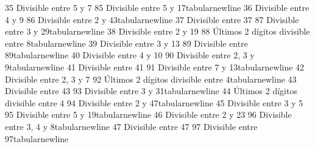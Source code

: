 {}35 \markdownRendererAmpersand{} Divisible entre 5 y 7 \markdownRendererAmpersand{} 85 \markdownRendererAmpersand{} Divisible entre 5 y 17\markdownRendererBackslash{}tabularnewline\markdownRendererSoftLineBreak
{}36 \markdownRendererAmpersand{} Divisible entre 4 y 9 \markdownRendererAmpersand{} 86 \markdownRendererAmpersand{} Divisible entre 2 y 43\markdownRendererBackslash{}tabularnewline\markdownRendererSoftLineBreak
{}37 \markdownRendererAmpersand{} Divisible entre 37 \markdownRendererAmpersand{} 87 \markdownRendererAmpersand{} Divisible entre 3 y 29\markdownRendererBackslash{}tabularnewline\markdownRendererSoftLineBreak
{}38 \markdownRendererAmpersand{} Divisible entre 2 y 19 \markdownRendererAmpersand{} 88 \markdownRendererAmpersand{} Últimos 2 dígitos divisible entre 8\markdownRendererBackslash{}tabularnewline\markdownRendererSoftLineBreak
{}39 \markdownRendererAmpersand{} Divisible entre 3 y 13 \markdownRendererAmpersand{} 89 \markdownRendererAmpersand{} Divisible entre 89\markdownRendererBackslash{}tabularnewline\markdownRendererSoftLineBreak
{}40 \markdownRendererAmpersand{} Divisible entre 4 y 10 \markdownRendererAmpersand{} 90 \markdownRendererAmpersand{} Divisible entre 2, 3 y 9\markdownRendererBackslash{}tabularnewline\markdownRendererSoftLineBreak
{}41 \markdownRendererAmpersand{} Divisible entre 41 \markdownRendererAmpersand{} 91 \markdownRendererAmpersand{} Divisible entre 7 y 13\markdownRendererBackslash{}tabularnewline\markdownRendererSoftLineBreak
{}42 \markdownRendererAmpersand{} Divisible entre 2, 3 y 7 \markdownRendererAmpersand{} 92 \markdownRendererAmpersand{} Últimos 2 dígitos divisible entre 4\markdownRendererBackslash{}tabularnewline\markdownRendererSoftLineBreak
{}43 \markdownRendererAmpersand{} Divisible entre 43 \markdownRendererAmpersand{} 93 \markdownRendererAmpersand{} Divisible entre 3 y 31\markdownRendererBackslash{}tabularnewline\markdownRendererSoftLineBreak
{}44 \markdownRendererAmpersand{} Últimos 2 dígitos divisible entre 4 \markdownRendererAmpersand{} 94 \markdownRendererAmpersand{} Divisible entre 2 y 47\markdownRendererBackslash{}tabularnewline\markdownRendererSoftLineBreak
{}45 \markdownRendererAmpersand{} Divisible entre 3 y 5 \markdownRendererAmpersand{} 95 \markdownRendererAmpersand{} Divisible entre 5 y 19\markdownRendererBackslash{}tabularnewline\markdownRendererSoftLineBreak
{}46 \markdownRendererAmpersand{} Divisible entre 2 y 23 \markdownRendererAmpersand{} 96 \markdownRendererAmpersand{} Divisible entre 3, 4 y 8\markdownRendererBackslash{}tabularnewline\markdownRendererSoftLineBreak
{}47 \markdownRendererAmpersand{} Divisible entre 47 \markdownRendererAmpersand{} 97 \markdownRendererAmpersand{} Divisible entre 97\markdownRendererBackslash{}tabularnewline\markdownRendererSoftLineBreak
